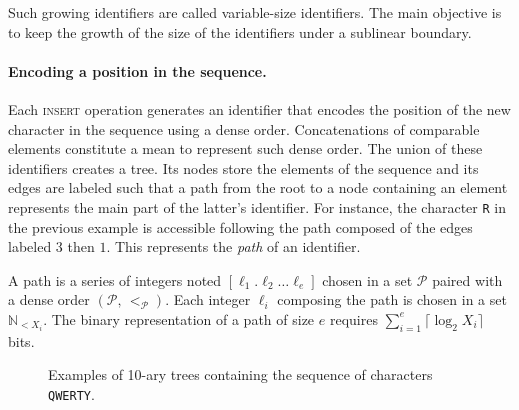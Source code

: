 Such growing identifiers are called variable-size identifiers. The main
objective is to keep the growth of the size of the identifiers under a sublinear
boundary.

\paragraph{Encoding a position in the sequence.}

Each \textsc{insert} operation generates an identifier that encodes the position
of the new character in the sequence using a dense order. Concatenations of
comparable elements constitute a mean to represent such dense order.
The union of these identifiers creates a tree. Its nodes store the elements of
the sequence and its edges are labeled such that a path from the root to a node
containing an element represents the main part of the latter's identifier. For
instance, the character \texttt{R} in the previous example is accessible
following the path composed of the edges labeled $3$ then $1$.  This represents
the \emph{path} of an identifier.

\begin{definition}[Path]
  A path is a series of integers noted $[\ell_1.\ell_2\ldots \ell_e]$ chosen in a
  set $\mathcal{P}$ paired with a dense order $(\mathcal{P},\, <_\mathcal{P})$.
  Each integer $\ell_i$ composing the path is chosen in a set
  $\mathbb{N}_{<X_i}$. The binary representation of a path of size $e$ requires
  $\textstyle \sum\nolimits_{i=1}^e \lceil \log_2 X_i\rceil$ bits.
\end{definition}

\begin{figure*}
  \centering
  \hspace{20pt}
  \caption{Examples of 10-ary trees containing the sequence of characters
    \texttt{QWERTY}.}
\end{figure*}


